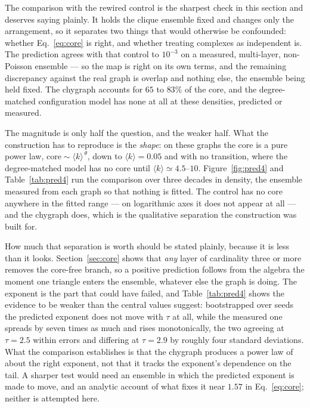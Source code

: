 \documentclass[aps,pre,twocolumn,superscriptaddress,floatfix]{revtex4-2}
\newcommand{\ave}[1]{\langle #1 \rangle}
\begin{document}
The comparison with the rewired control is the sharpest check in this section
and deserves saying plainly. It holds the clique ensemble fixed and changes only
the arrangement, so it separates two things that would otherwise be confounded:
whether Eq.~\eqref{eq:core} is right, and whether treating complexes as
independent is. The prediction agrees with that control to $10^{-3}$ on a
measured, multi-layer, non-Poisson ensemble --- so the map is right on its own
terms, and the remaining discrepancy against the real graph is overlap and
nothing else, the ensemble being held fixed. The chygraph accounts for $65$ to
$83\%$ of the core, and the degree-matched configuration model has none at all
at these densities, predicted or measured.

The magnitude is only half the question, and the weaker half. What the
construction has to reproduce is the \emph{shape}: on these graphs the core is a
pure power law, $\mathrm{core}\sim\ave{k}^{\,\theta}$, down to $\ave{k}=0.05$ and
with no transition, where the degree-matched model has no core until
$\ave{k}\simeq4.5$--$10$. Figure~\ref{fig:pred4} and Table~\ref{tab:pred4} run the comparison over three
decades in density, the ensemble measured from each graph so that nothing is
fitted. The control has no core anywhere in the fitted range --- on logarithmic
axes it does not appear at all --- and the chygraph does, which is the
qualitative separation the construction was built for.

How much that separation is worth should be stated plainly, because it is less
than it looks. Section~\ref{sec:core} shows that \emph{any} layer of cardinality
three or more removes the core-free branch, so a positive prediction follows
from the algebra the moment one triangle enters the ensemble, whatever else the
graph is doing. The exponent is the part that could have failed, and
Table~\ref{tab:pred4} shows the evidence to be weaker than the central values
suggest: bootstrapped over seeds the predicted exponent does not move with
$\tau$ at all, while the measured one spreads by seven times as much and rises
monotonically, the two agreeing at $\tau=2.5$ within errors and differing at
$\tau=2.9$ by roughly four standard deviations. What the comparison establishes
is that the chygraph produces a power law of about the right exponent, not that
it tracks the exponent's dependence on the tail. A sharper test would need an
ensemble in which the predicted exponent is made to move, and an analytic
account of what fixes it near $1.57$ in Eq.~\eqref{eq:core}; neither is
attempted here.
\end{document}

